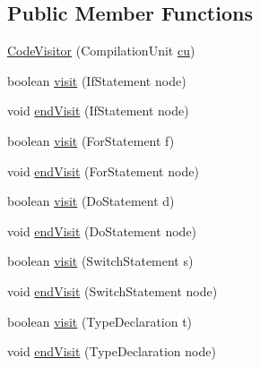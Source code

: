 \subsection*{Public Member Functions}
\begin{DoxyCompactItemize}
\item 
\hyperlink{classit_1_1isislab_1_1masonassisteddocumentation_1_1visitor_1_1_code_visitor_a23012a94a2c90abe9c89b241d11ce586}{Code\-Visitor} (Compilation\-Unit \hyperlink{classit_1_1isislab_1_1masonassisteddocumentation_1_1visitor_1_1_code_visitor_ad567a4c5516729e6ad3c520b779e5fbf}{cu})
\item 
boolean \hyperlink{classit_1_1isislab_1_1masonassisteddocumentation_1_1visitor_1_1_code_visitor_a2cf8c545b996ca299f1767f77b4c9c8f}{visit} (If\-Statement node)
\item 
void \hyperlink{classit_1_1isislab_1_1masonassisteddocumentation_1_1visitor_1_1_code_visitor_a69c11f1c13b49c21a1fdc5b9131e82db}{end\-Visit} (If\-Statement node)
\item 
boolean \hyperlink{classit_1_1isislab_1_1masonassisteddocumentation_1_1visitor_1_1_code_visitor_ad03bbbf8800ecf154acc28a75a79ad7b}{visit} (For\-Statement f)
\item 
void \hyperlink{classit_1_1isislab_1_1masonassisteddocumentation_1_1visitor_1_1_code_visitor_a60512fd6a6d5601b1977bbe39407522b}{end\-Visit} (For\-Statement node)
\item 
boolean \hyperlink{classit_1_1isislab_1_1masonassisteddocumentation_1_1visitor_1_1_code_visitor_ad97a8e87a73d80a3be2cbf784ceee731}{visit} (Do\-Statement d)
\item 
void \hyperlink{classit_1_1isislab_1_1masonassisteddocumentation_1_1visitor_1_1_code_visitor_a635c2ee5422e31fb4eac22ba3a828244}{end\-Visit} (Do\-Statement node)
\item 
boolean \hyperlink{classit_1_1isislab_1_1masonassisteddocumentation_1_1visitor_1_1_code_visitor_aea58bf6bc0baf1f20a85bf715cfa07da}{visit} (Switch\-Statement s)
\item 
void \hyperlink{classit_1_1isislab_1_1masonassisteddocumentation_1_1visitor_1_1_code_visitor_aba38ab15bd632a6cedb45db36a4c0abd}{end\-Visit} (Switch\-Statement node)
\item 
boolean \hyperlink{classit_1_1isislab_1_1masonassisteddocumentation_1_1visitor_1_1_code_visitor_aed58991441b8cdbddd6c17c732bcece6}{visit} (Type\-Declaration t)
\item 
void \hyperlink{classit_1_1isislab_1_1masonassisteddocumentation_1_1visitor_1_1_code_visitor_a8aa7283c1529d856a5c4f44a20ac0d5b}{end\-Visit} (Type\-Declaration node)

\end{DoxyCompactItemize}
